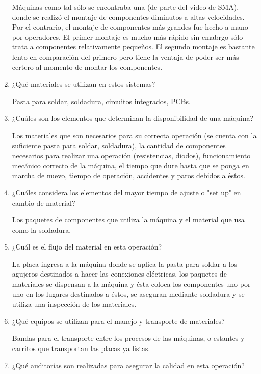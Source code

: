 \documentclass[12pt, letterpaper]{article}
\begin{document}
\begin{enumerate}
		Máquinas como tal sólo se encontraba una (de parte del video de SMA), donde se realizó el montaje de componentes diminutos a altas velocidades. Por el contrario, el montaje de componentes más grandes fue hecho a mano por operadores. El primer montaje es mucho más rápido sin emabrgo sólo trata a componentes relativamente pequeños. El segundo montaje es bastante lento en comparación del primero pero tiene la ventaja de poder ser más certero al momento de montar los componentes.

	\item ¿Qué materiales se utilizan en estos sistemas?

		Pasta para soldar, soldadura, circuitos integrados, PCBs.

	\item ¿Cuáles son los elementos que determinan la disponibilidad de una máquina?

		Los materiales que son necesarios para su correcta operación (se cuenta con la suficiente pasta para soldar, soldadura), la cantidad de componentes necesarios para realizar una operación (resistencias, diodos), funcionamiento mecánico correcto de la máquina, el tiempo que dure hasta que se ponga en marcha de nuevo, tiempo de operación, accidentes y paros debidos a éstos.

	\item ¿Cuáles considera los elementos del mayor tiempo de ajuste o "set up" en cambio de material?

		Los paquetes de componentes que utiliza la máquina y el material que usa como la soldadura.

	\item ¿Cuál es el flujo del material en esta operación?

		La placa ingresa a la máquina donde se aplica la pasta para soldar a los agujeros destinados a hacer las conexiones eléctricas, los paquetes de materiales se dispensan a la máquina y ésta coloca los componentes uno por uno en los lugares destinados a éstos, se aseguran mediante soldadura y se utiliza una inspección de los materiales.

	\item ¿Qué equipos se utilizan para el manejo y transporte de materiales?

		Bandas para el transporte entre los procesos de las máquinas, o estantes y carritos que transportan las placas ya listas.

	\item ¿Qué auditorías son realizadas para asegurar la calidad en esta operación?


\end{enumerate}
\end{document}
